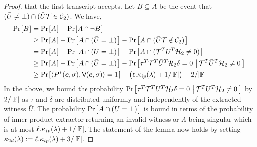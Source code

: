 \begin{proof}
that the first transcript accepts. Let $B\subseteq A$ be the event that
$(\bar{U}\neq\bot)\cap (\bar{U}\mathcal{T}\in \mathcal{C}_2)$. We have,
\begin{align*}
\prob{B} &= \prob{A} - \prob{A\cap \neg B} \\
	&\geq \prob{A} - \prob{A\cap (\bar{U}=\bot)} - \prob{A\cap
(\bar{U}\mc{T}\not\in \mc{C}_2)} \\
	&= \prob{A} - \prob{A\cap (\bar{U}=\bot)} - \prob{A\cap
(\mc{T}^T\bar{U}^T\mc{H}_2\neq 0)} \\
	&\geq \prob{A} - \prob{A\cap (\bar{U}=\bot)} -
\condprob{\tau^T\mc{T}^T\bar{U}^T\mc{H}_2\delta=
0}{\mc{T}^T\bar{U}^T\mc{H}_2\neq 0} \\
	&\geq \prob{\langle P^\ast(\bm{c},\sigma),\verifier(\bm{c},\sigma)\rangle=1}
- \big(\ell.\kappa_{ip}(\secpar)+1/|\FF|\big) - 2/|\FF|
\end{align*} 
In the above, we bound the probability $\condprob{\tau^T\mc{T}^T\bar{U}^T\mc{H}_2\delta=
0}{\mc{T}^T\bar{U}^T\mc{H}_2\neq 0}$ by $2/|\mathbb{F}|$ as $\tau$ and $\delta$ are
distributed uniformly and independently of the extracted witness $\bar{U}$. The
probability $\prob{A\cap (\bar{U}=\bot)}$ is bound in terms of the probability
of inner product extractor returning an invalid witness or $\Lambda$ being
singular which is at most $\ell.\kappa_{ip}(\lambda)+1/|\mathbb{F}|$. The
statement of the lemma now holds by setting
$\kappa_{2d}(\lambda):=\ell.\kappa_{ip}(\lambda) + 3/|\mathbb{F}|$.
\end{proof}

